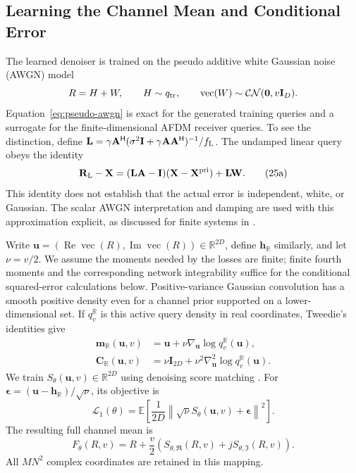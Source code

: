 \documentclass[10pt,a4paper]{article}
\newcommand{\CN}{\mathcal{CN}}
\newcommand{\E}{\mathbb{E}}
\newcommand{\I}{\mathbf{I}}
\newcommand{\vect}{\operatorname{vec}}
\newcommand{\relu}{\operatorname{Re}}
\newcommand{\imag}{\operatorname{Im}}
\newcommand{\norm}[1]{\left\lVert#1\right\rVert}
\begin{document}
\subsection{Learning the Channel Mean and Conditional Error}

The learned denoiser is trained on the pseudo additive white Gaussian
noise (AWGN) model
\begin{equation}
 R=H+W,\qquad H\sim q_{\rm tr},\qquad
 \vect(W)\sim\CN(\mathbf{0},v\I_D).
 \label{eq:pseudo-awgn}
\end{equation}
Equation~\eqref{eq:pseudo-awgn} is exact for the generated training
queries and a surrogate for the finite-dimensional AFDM receiver queries.
To see the distinction, define
$\mathbf L=\gamma\mathbf A^{\mathsf H}
(\sigma^2\I+\gamma\mathbf A\mathbf A^{\mathsf H})^{-1}/f_{\rm L}$.
The undamped linear query obeys the identity
\begin{equation*}
 \mathbf R_{\rm L}-\mathbf X
 =(\mathbf L\mathbf A-\I)(\mathbf X-\mathbf X^{\rm pri})
 +\mathbf L\mathbf W.
 \tag{25a}\label{eq:linear-query-error}
\end{equation*}
This identity does not establish that the actual error is independent,
white, or Gaussian. The scalar AWGN interpretation and damping are used
with this approximation explicit, as discussed for finite systems in
\cite[Sec.~V-B1]{cai2026}.

Write
$\mathbf{u}=(\relu\vect(R),\imag\vect(R))\in\mathbb{R}^{2D}$,
define $\mathbf{h}_{\mathbb R}$ similarly, and let $\nu=v/2$.
We assume the moments needed by the losses are finite; finite fourth
moments and the corresponding network integrability suffice for the
conditional squared-error calculations below. Positive-variance Gaussian
convolution has a smooth positive density even for a channel prior
supported on a lower-dimensional set. If $q_v^{\mathbb R}$ is this
active query density in real coordinates, Tweedie's identities
\cite{efron2011,cai2026} give
\begin{align}
 \mathbf{m}_{\mathbb R}(\mathbf{u},v)
 &=\mathbf{u}+\nu\nabla_{\mathbf{u}}\log q_v^{\mathbb R}(\mathbf{u}),
 \label{eq:tweedie-mean}\\
 \mathbf{C}_{\mathbb R}(\mathbf{u},v)
 &=\nu\I_{2D}+\nu^2\nabla_{\mathbf{u}}^2\log q_v^{\mathbb R}(\mathbf{u}).
 \label{eq:tweedie-covariance}
\end{align}
We train $S_\theta(\mathbf{u},v)\in\mathbb{R}^{2D}$ using denoising
score matching \cite{vincent2011,cai2026}. For
$\bm\epsilon=(\mathbf{u}-\mathbf{h}_{\mathbb R})/\sqrt\nu$, its objective is
\begin{equation}
 \mathcal{L}_1(\theta)=\E\left[
 \frac{1}{2D}\norm{\sqrt\nu S_\theta(\mathbf{u},v)+\bm\epsilon}^2\right].
 \label{eq:first-loss}
\end{equation}
The resulting full channel mean is
\begin{equation}
 F_\theta(R,v)=R+\frac v2
       \left(S_{\theta,\Re}(R,v)+jS_{\theta,\Im}(R,v)\right).
 \label{eq:learned-mean}
\end{equation}
All $M N^2$ complex coordinates are retained in this mapping.
\end{document}
